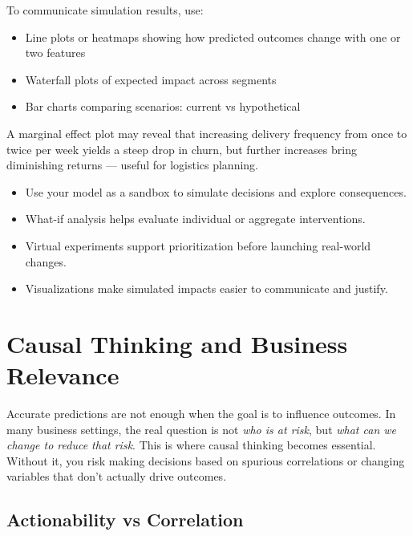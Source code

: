 \documentclass[12pt,openany]{book}
\begin{document}
To communicate simulation results, use:
\begin{itemize}
  \item Line plots or heatmaps showing how predicted outcomes change with one or two features
  \item Waterfall plots of expected impact across segments
  \item Bar charts comparing scenarios: current vs hypothetical
\end{itemize}

\begin{examplebox}
A marginal effect plot may reveal that increasing delivery frequency from once to twice per week yields a steep drop in churn, but further increases bring diminishing returns — useful for logistics planning.
\end{examplebox}

\begin{summarybox}
\begin{itemize}
  \item Use your model as a sandbox to simulate decisions and explore consequences.
  \item What-if analysis helps evaluate individual or aggregate interventions.
  \item Virtual experiments support prioritization before launching real-world changes.
  \item Visualizations make simulated impacts easier to communicate and justify.
\end{itemize}
\end{summarybox}




\chapter{Causal Thinking and Business Relevance}

Accurate predictions are not enough when the goal is to influence outcomes. In many business settings, the real question is not \textit{who is at risk}, but \textit{what can we change to reduce that risk}. This is where causal thinking becomes essential. Without it, you risk making decisions based on spurious correlations or changing variables that don't actually drive outcomes.

\section{Actionability vs Correlation}
\end{document}
